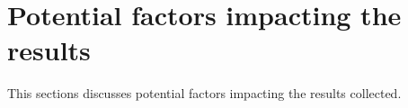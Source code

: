 \section{Potential factors impacting the results }
\label{sec:truth_results}

This sections discusses potential factors impacting the results collected.






